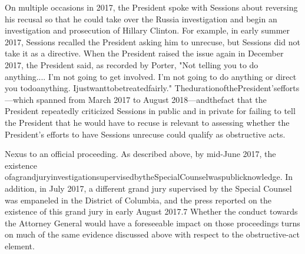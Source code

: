 On multiple occasions in 2017, the President spoke with Sessions about reversing his recusal so that he could take over the Russia investigation and begin an investigation and prosecution of Hillary Clinton.
For example, in early summer 2017, Sessions recalled the President asking him to unrecuse, but Sessions did not take it as a directive.
When the President raised the issue again in December 2017, the President said, as recorded by Porter, "Not telling you to do anything....
I'm not going to get involved.
I'm not going to do anything or direct you todoanything.
Ijustwanttobetreatedfairly."
ThedurationofthePresident'sefforts—which spanned from March 2017 to August 2018—andthefact that the President repeatedly criticized Sessions in public and in private for failing to tell the President that he would have to recuse is relevant to assessing whether the President's efforts to have Sessions unrecuse could qualify as obstructive acts.

Nexus to an official proceeding.
As described above, by mid-June 2017, the existence ofagrandjuryinvestigationsupervisedbytheSpecialCounselwaspublicknowledge.
In addition, in July 2017, a different grand jury supervised by the Special Counsel was empaneled in the District of Columbia, and the press reported on the existence of this grand jury in early August 2017.7
Whether the conduct towards the Attorney General would have a foreseeable impact on those proceedings turns on much of the same evidence discussed above with respect to the obstructive-act element.

